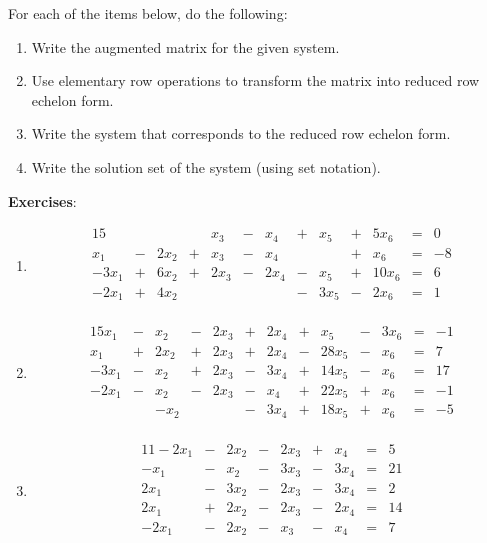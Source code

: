 \documentclass[12pt]{article}
\begin{document}
For each of the items below, do the following:
\begin{enumerate}
\item Write the augmented matrix for the given system.
\item Use elementary row operations to transform the matrix into reduced row echelon form.
\item Write the system that corresponds to the reduced row echelon form.
\item Write the solution set of the system (using set notation).
\end{enumerate}

\textbf{Exercises}:
\begin{enumerate}
\item \begin{alignat*}{15}
&{}{}&&{}{}&x_{3} &{}-{}& x_{4} &{}+{}& x_{5} &{}+{}& 5 x_{6} &{}={}&0\\ 
x_{1} &{}-{}& 2 x_{2} &{}+{}& x_{3} &{}-{}& x_{4}&{}{}& &{}+{}& x_{6} &{}={}&-8\\ 
- 3 x_{1} &{}+{}& 6 x_{2} &{}+{}& 2 x_{3} &{}-{}& 2 x_{4} &{}-{}& x_{5} &{}+{}& 10 x_{6} &{}={}&6\\ 
- 2 x_{1} &{}+{}& 4 x_{2}&{}{}&&{}{}& &{}-{}& 3 x_{5} &{}-{}& 2 x_{6} &{}={}&1\\ 
\end{alignat*}

\item \begin{alignat*}{15}
x_{1} &{}-{}& x_{2} &{}-{}& 2 x_{3} &{}+{}& 2 x_{4} &{}+{}& x_{5} &{}-{}& 3 x_{6} &{}={}&-1\\ 
x_{1} &{}+{}& 2 x_{2} &{}+{}& 2 x_{3} &{}+{}& 2 x_{4} &{}-{}& 28 x_{5} &{}-{}& x_{6} &{}={}&7\\ 
- 3 x_{1} &{}-{}& x_{2} &{}+{}& 2 x_{3} &{}-{}& 3 x_{4} &{}+{}& 14 x_{5} &{}-{}& x_{6} &{}={}&17\\ 
- 2 x_{1} &{}-{}& x_{2} &{}-{}& 2 x_{3} &{}-{}& x_{4} &{}+{}& 22 x_{5} &{}+{}& x_{6} &{}={}&-1\\ 
&{}{}&- x_{2}&{}{}& &{}-{}& 3 x_{4} &{}+{}& 18 x_{5} &{}+{}& x_{6} &{}={}&-5\\ 
\end{alignat*}

\item \begin{alignat*}{11}
- 2 x_{1} &{}-{}& 2 x_{2} &{}-{}& 2 x_{3} &{}+{}& x_{4} &{}={}&5\\ 
- x_{1} &{}-{}& x_{2} &{}-{}& 3 x_{3} &{}-{}& 3 x_{4} &{}={}&21\\ 
2 x_{1} &{}-{}& 3 x_{2} &{}-{}& 2 x_{3} &{}-{}& 3 x_{4} &{}={}&2\\ 
2 x_{1} &{}+{}& 2 x_{2} &{}-{}& 2 x_{3} &{}-{}& 2 x_{4} &{}={}&14\\ 
- 2 x_{1} &{}-{}& 2 x_{2} &{}-{}& x_{3} &{}-{}& x_{4} &{}={}&7\\ 
\end{alignat*}


\end{enumerate}
\end{document}

